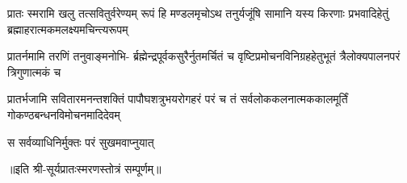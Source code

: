 

\fourlineindentedshloka
{प्रातः स्मरामि खलु तत्सवितुर्वरेण्यम् }
{रूपं हि मण्डलमृचोऽथ तनुर्यजूंषि}
{सामानि यस्य किरणाः प्रभवादिहेतुं}
{ब्रह्माहरात्मकमलक्ष्यमचिन्त्यरूपम्}

\fourlineindentedshloka
{प्रातर्नमामि तरणिं तनुवाङ्मनोभि-}
{र्ब्रह्मेन्द्रपूर्वकसुरैर्नुतमर्चितं च}
{वृष्टिप्रमोचनविनिग्रहहेतुभूतं}
{त्रैलोक्यपालनपरं त्रिगुणात्मकं च}

\fourlineindentedshloka
{प्रातर्भजामि सवितारमनन्तशक्तिं}
{पापौघशत्रुभयरोगहरं परं च}
{तं सर्वलोककलनात्मककालमूर्तिं}
{गोकण्ठबन्धनविमोचनमादिदेवम्}

{स सर्वव्याधिनिर्मुक्तः परं सुखमवाप्नुयात्}

॥इति श्री-सूर्यप्रातःस्मरणस्तोत्रं सम्पूर्णम्॥